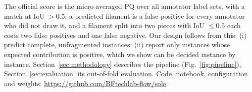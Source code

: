 The official score is the micro-averaged PQ over all annotator label sets,
with a match at IoU $>0.5$: a predicted filament is a false positive for every
annotator who did not draw it, and a filament split into two pieces with
IoU $\le0.5$ each costs two false positives and one false negative. Our
design follows from this: (i) predict complete, unfragmented instances;
(ii) report only instances whose expected contribution is positive, which
we show can be decided instance by instance. Section~\ref{sec:methodology}
describes the pipeline (Fig.~\ref{fig:pipeline}), Section~\ref{sec:evaluation}
its out-of-fold evaluation. Code, notebook, configuration and weights:
\url{https://github.com/BFtechlab-flow/sole}.
